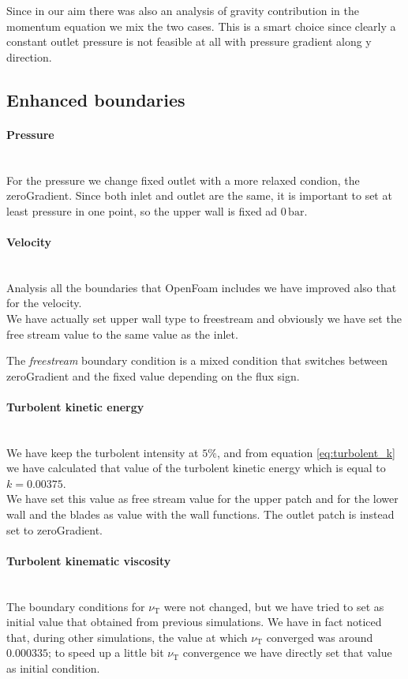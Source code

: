 \documentclass[a4paper,12pt]{article}
\newcommand{\nut}{\nu_\text{T}}
\begin{document}
Since in our aim there was also an analysis of gravity contribution in the momentum equation we mix the two cases.
This is a smart choice since clearly a constant outlet pressure is not feasible at all with pressure gradient along y direction.

\subsection{Enhanced boundaries}

\paragraph{Pressure} \mbox{}\\
For the pressure we change fixed outlet with a more relaxed condion, the zeroGradient.
Since both inlet and outlet are the same, it is important to set at least pressure in one point, so the upper wall is fixed ad $0\,\text{bar}$.

\paragraph{Velocity} \mbox{}\\
Analysis all the boundaries that OpenFoam includes we have improved also that for the velocity.\\
We have actually set upper wall type to freestream and obviously we have set the free stream value to the same value as the inlet.

The \emph{freestream} boundary condition is a mixed condition that switches between zeroGradient and the fixed value depending on the flux sign.

\paragraph{Turbolent kinetic energy}\mbox{}\\
We have keep the turbolent intensity at $5\%$, and from equation \ref{eq:turbolent_k} we have calculated that value of the turbolent kinetic energy which is equal to $k = 0.00375$.\\
We have set this value as free stream value for the upper patch and for the lower wall and the blades as value with the wall functions.
The outlet patch is instead set to zeroGradient.

\paragraph{Turbolent kinematic viscosity}\mbox{}\\
The boundary conditions for $\nut$ were not changed, but we have tried to set as initial value that obtained from previous simulations. We have in fact noticed that, during other simulations, the value at which $\nut$ converged was around $0.000335$; to speed up a little bit $\nut$ convergence we have directly set that value as initial condition.
\end{document}
